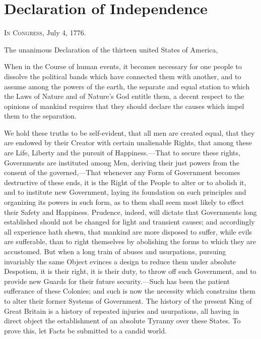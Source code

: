 
\author{Thomas Jefferson}
\chapter{Declaration of Independence}

\noindent\textsc{In Congress}, July 4, 1776.

\noindent The unanimous Declaration of the thirteen united States of
America,

When in the Course of human events, it becomes necessary for one
people to dissolve the political bands which have connected them with
another, and to assume among the powers of the earth, the separate and
equal station to which the Laws of Nature and of Nature's God entitle
them, a decent respect to the opinions of mankind requires that they
should declare the causes which impel them to the separation.

We hold these truths to be self-evident, that all men are created
equal, that they are endowed by their Creator with certain unalienable
Rights, that among these are Life, Liberty and the pursuit of
Happiness.---That to secure these rights, Governments are instituted
among Men, deriving their just powers from the consent of the
governed,---That whenever any Form of Government becomes destructive
of these ends, it is the Right of the People to alter or to abolish
it, and to institute new Government, laying its foundation on such
principles and organizing its powers in such form, as to them shall
seem most likely to effect their Safety and Happiness. Prudence,
indeed, will dictate that Governments long established should not be
changed for light and transient causes; and accordingly all experience
hath shewn, that mankind are more disposed to suffer, while evils are
sufferable, than to right themselves by abolishing the forms to which
they are accustomed. But when a long train of abuses and usurpations,
pursuing invariably the same Object evinces a design to reduce them
under absolute Despotism, it is their right, it is their duty, to
throw off such Government, and to provide new Guards for their future
security.---Such has been the patient sufferance of these Colonies;
and such is now the necessity which constrains them to alter their
former Systems of Government. The history of the present King of Great
Britain is a history of repeated injuries and usurpations, all
having in direct object the establishment of an absolute Tyranny over
these States. To prove this, let Facts be submitted to a candid
world.

